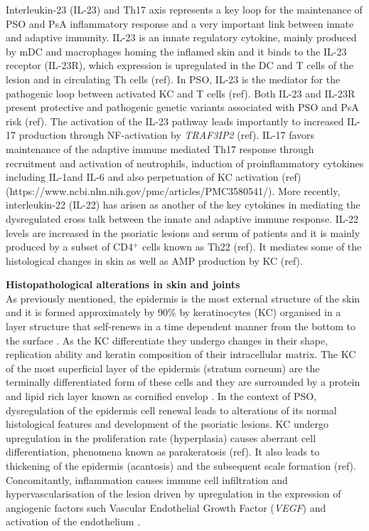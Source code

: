 Interleukin-23 (IL-23) and Th17 axis represents a key loop for the maintenance of PSO and PsA inflammatory response and a very important link between innate and adaptive immunity. IL-23 is an innate regulatory cytokine, mainly produced by mDC and macrophages homing the inflamed skin and it binds to the IL-23 receptor (IL-23R), which expression is upregulated in the DC and T cells of the lesion and in circulating Th cells (ref). In PSO, IL-23 is the mediator for the pathogenic loop between activated KC and T cells (ref). Both IL-23 and IL-23R present protective and pathogenic genetic variants associated with PSO and PsA risk (ref). The activation of the IL-23 pathway leads importantly to increased IL-17 production through NF-\kappaB activation by \textit{TRAF3IP2} (ref). IL-17 favors maintenance of the adaptive immune mediated Th17 response through recruitment and activation of neutrophils, induction of proinflammatory cytokines including IL-1\beta and IL-6 and also perpetuation of KC activation (ref) (https://www.ncbi.nlm.nih.gov/pmc/articles/PMC3580541/). %
More recently, interleukin-22 (IL-22) has arisen as another of the key cytokines in mediating the dysregulated cross talk between the innate and adaptive immune response. IL-22 levels are increased in the psoriatic lesions and serum of patients and it is mainly produced by a subset of CD4$^+$ cells known as Th22 (ref). It mediates some of the histological changes in skin as well as AMP production by KC (ref).


\textbf{Histopathological alterations in skin and joints}\\

As previously mentioned, the epidermis is the most external structure of the skin and it is formed approximately by 90\% by keratinocytes (KC) organised in a layer structure that self-renews in a time dependent manner from the bottom to the surface \parencite{Wikramanayake2014}. As the KC differentiate they undergo changes in their shape, replication ability and keratin composition of their intracellular matrix. The KC of the most superficial layer of the epidermis (stratum corneum) are the terminally differentiated form of these cells and they are surrounded by a protein and lipid rich layer known as cornified envelop . In the context of PSO, dysregulation of the epidermis cell renewal leads to alterations of its normal histological features and development of the psoriatic lesions. KC undergo upregulation in the proliferation rate (hyperplasia) causes aberrant cell differentiation, phenomena known as parakeratosis (ref). It also leads to thickening of the epidermis (acantosis) and the subsequent scale formation (ref). Concomitantly, inflammation causes immune cell infiltration and hypervascularisation of the lesion driven by upregulation in the expression of angiogenic factors such Vascular Endothelial Growth Factor (\textit{VEGF}) and activation of the endothelium \parencite{Perera2012}. 

